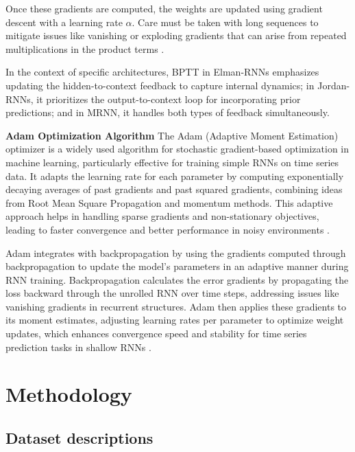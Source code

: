 \documentclass[conference, 10pt]{IEEEtran}
\begin{document}
Once these gradients are computed, the weights are updated using gradient descent with a learning rate \( \alpha \).
Care must be taken with long sequences to mitigate issues like vanishing or exploding gradients that can arise from
repeated multiplications in the product terms \cite{quarkmlBackpropagationThrough}.

In the context of specific architectures, BPTT in Elman-RNNs emphasizes updating the hidden-to-context feedback to
capture internal dynamics; in Jordan-RNNs, it prioritizes the output-to-context loop for incorporating prior
predictions; and in MRNN, it handles both types of feedback simultaneously.

\textbf{Adam Optimization Algorithm}
The Adam (Adaptive Moment Estimation) optimizer is a widely used algorithm for stochastic gradient-based optimization in
machine learning, particularly effective for training simple RNNs on time series data. It adapts the learning rate for
each parameter by computing exponentially decaying averages of past gradients and past squared gradients, combining
ideas from Root Mean Square Propagation and momentum methods. This adaptive approach helps in handling sparse gradients
and non-stationary objectives, leading to faster convergence and better performance in noisy environments
\cite{kingma2017adammethodstochasticoptimization} \cite{machinelearningmasteryGentleIntroduction}.

Adam integrates with backpropagation by using the gradients computed through backpropagation to update the model's
parameters in an adaptive manner during RNN training. Backpropagation calculates the error gradients by propagating the
loss backward through the unrolled RNN over time steps, addressing issues like vanishing gradients in recurrent
structures. Adam then applies these gradients to its moment estimates, adjusting learning rates per parameter to
optimize weight updates, which enhances convergence speed and stability for time series prediction tasks in shallow RNNs \cite{machinelearningmasteryGentleIntroduction}.

\section{Methodology}
\subsection{Dataset descriptions}
\end{document}
